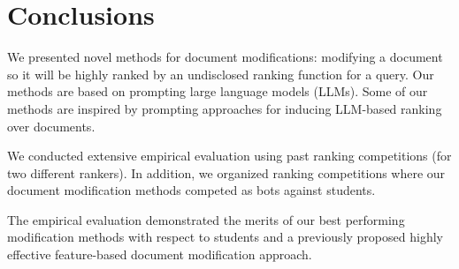 \section{Conclusions}
\label{sec:conclusions}
We presented novel methods for document
modifications: modifying a document so it will be highly ranked by an undisclosed ranking function for a query. Our methods are based on prompting large language models (LLMs). Some of our methods are inspired by prompting approaches for inducing LLM-based ranking over documents.

We conducted extensive empirical evaluation using past ranking
competitions (for two different rankers). In addition, we organized ranking competitions where our document modification methods competed as bots against students.

The empirical evaluation demonstrated the merits of our best
performing modification methods with respect to students and a
previously proposed highly effective feature-based document
modification approach.

\endinput



We present the primary results of a prompt-driven method for modifying documents in ranking competitions. Previous work \cite{goren2020ranking} introduced a method that promoted ranking by replacing passages in the original document, while maintaining a high level of document quality and faithfulness to the original. We propose a novel approach leveraging a prompt-driven method that incorporates past documents and their rankings into LLM agents. Our results demonstrate that the Pairwise and Listwise \bt s achieve improved ranking promotion compared to the prior method, as well as other participants (students or static documents). Additionally, in some cases, our method achieved higher levels of document faithfulness and quality. During the evaluation process, we introduced some novel metrics for faithfulness.

